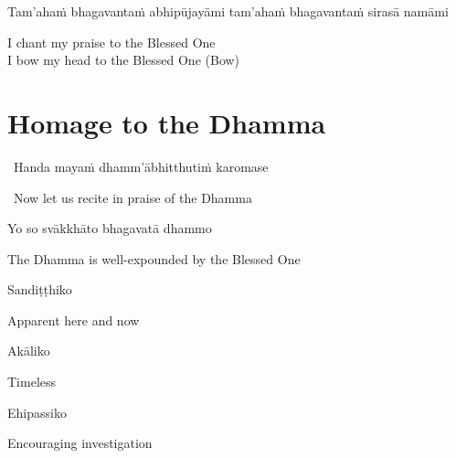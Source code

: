 \suttaRef{[SN 55.7]}

\begin{pali-hang}
  Tam'ahaṁ bhagavantaṁ abhipūjayāmi tam'ahaṁ bhagavantaṁ sirasā namāmi
\end{pali-hang}

\begin{english}
  I chant my praise to the Blessed One\\
  I bow my head to the Blessed One \hfill{\textnormal{\ifafive\fontsize{12.5}{18}\fi\ifninebythirteen\fontsize{9}{13}\fi\selectfont (Bow)}}
\end{english}

\suttaRef{[Thai]}



\section{Homage to the Dhamma}
\label{homage-dhamma}

\begin{leader}
  \anglebracketleft\ \hspace{-0.5mm}Handa mayaṁ dhamm'ābhitthutiṁ karomase \hspace{-0.5mm}\anglebracketright\
\end{leader}
\begin{leader-english-below-pali}
  \anglebracketleft\ \hspace{-0.5mm}Now let us recite in praise of the Dhamma \hspace{-0.5mm}\anglebracketright\
\end{leader-english-below-pali}

Yo so svākkhāto bhagavatā dhammo

\begin{english}
  The Dhamma is well-expounded by the Blessed One
\end{english}

Sandiṭṭhiko

\begin{english}
  Apparent here and now
\end{english}

Akāliko

\begin{english}
  Timeless
\end{english}

Ehipassiko

\begin{english}
  Encouraging investigation
\end{english}

